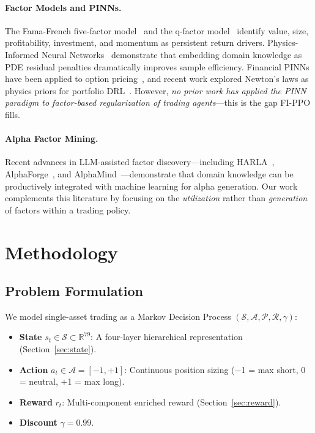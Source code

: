 \documentclass[11pt,a4paper]{article}
\begin{document}
\paragraph{Factor Models and PINNs.}
The Fama-French five-factor model~\cite{fama2015} and the q-factor model~\cite{hxz2015} identify value, size, profitability, investment, and momentum as persistent return drivers. Physics-Informed Neural Networks~\cite{raissi2019} demonstrate that embedding domain knowledge as PDE residual penalties dramatically improves sample efficiency. Financial PINNs have been applied to option pricing~\cite{alonso2025}, and recent work explored Newton's laws as physics priors for portfolio DRL~\cite{kanpinn2025}. However, \emph{no prior work has applied the PINN paradigm to factor-based regularization of trading agents}---this is the gap FI-PPO fills.

\paragraph{Alpha Factor Mining.}
Recent advances in LLM-assisted factor discovery---including HARLA~\cite{harla2025}, AlphaForge~\cite{alphaforge2025}, and AlphaMind~\cite{alphamind2025}---demonstrate that domain knowledge can be productively integrated with machine learning for alpha generation. Our work complements this literature by focusing on the \emph{utilization} rather than \emph{generation} of factors within a trading policy.

\section{Methodology}
\label{sec:method}

\subsection{Problem Formulation}
\label{sec:mdp}

We model single-asset trading as a Markov Decision Process $(\mathcal{S}, \mathcal{A}, \mathcal{P}, \mathcal{R}, \gamma)$:
\begin{itemize}[itemsep=0pt]
    \item \textbf{State} $s_t \in \mathcal{S} \subset \mathbb{R}^{79}$: A four-layer hierarchical representation (Section~\ref{sec:state}).
    \item \textbf{Action} $a_t \in \mathcal{A} = [-1, +1]$: Continuous position sizing ($-$1 = max short, 0 = neutral, $+$1 = max long).
    \item \textbf{Reward} $r_t$: Multi-component enriched reward (Section~\ref{sec:reward}).
    \item \textbf{Discount} $\gamma = 0.99$.
\end{itemize}
\end{document}
